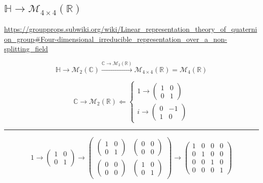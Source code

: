 \documentclass[
]{book}
\theoremstyle{definition}
\theoremstyle{definition}
\theoremstyle{definition}
\theoremstyle{definition}
\theoremstyle{remark}
\begin{document}
\subsection{\texorpdfstring{\(\mathbb{H}\rightarrow\mathcal{M}_{4\times4}\left(\mathbb{R}\right)\)}{\textbackslash mathbb\{H\}\textbackslash rightarrow\textbackslash mathcal\{M\}\_\{4\textbackslash times4\}\textbackslash left(\textbackslash mathbb\{R\}\textbackslash right)}}\label{mathbbhrightarrowmathcalm_4times4leftmathbbrright}

\url{https://groupprops.subwiki.org/wiki/Linear_representation_theory_of_quaternion_group\#Four-dimensional_irreducible_representation_over_a_non-splitting_field}

\[
\mathbb{H}\rightarrow\mathcal{M}_{2}\left(\mathbb{C}\right)\overset{\mathbb{C}\rightarrow\mathcal{M}_{2}\left(\mathbb{R}\right)}{\rightarrow}\mathcal{M}_{4\times4}\left(\mathbb{R}\right)=\mathcal{M}_{4}\left(\mathbb{R}\right)
\]

\[
\mathbb{C}\rightarrow\mathcal{M}_{2}\left(\mathbb{R}\right)\Leftarrow\begin{cases}
1\rightarrow\begin{pmatrix}1 & 0\\
0 & 1
\end{pmatrix}\\
i\rightarrow\begin{pmatrix}0 & -1\\
1 & 0
\end{pmatrix}
\end{cases}
\]

\begin{center}\rule{0.5\linewidth}{0.5pt}\end{center}

\[
1\rightarrow\begin{pmatrix}1 & 0\\
0 & 1
\end{pmatrix}\rightarrow\begin{pmatrix}\begin{pmatrix}1 & 0\\
0 & 1
\end{pmatrix} & \begin{pmatrix}0 & 0\\
0 & 0
\end{pmatrix}\\
\begin{pmatrix}0 & 0\\
0 & 0
\end{pmatrix} & \begin{pmatrix}1 & 0\\
0 & 1
\end{pmatrix}
\end{pmatrix}\rightarrow\begin{pmatrix}1 & 0 & 0 & 0\\
0 & 1 & 0 & 0\\
0 & 0 & 1 & 0\\
0 & 0 & 0 & 1
\end{pmatrix}
\]
\end{document}
